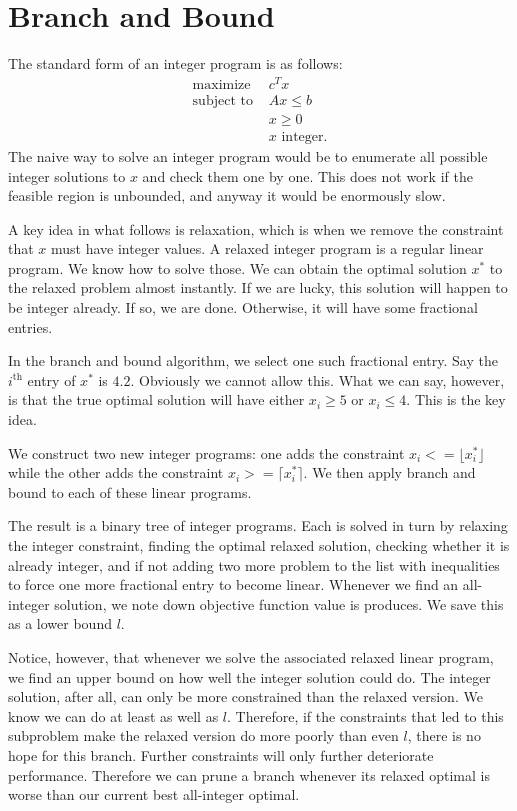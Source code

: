 \documentclass{article}
\begin{document}
\section*{Branch and Bound}

The standard form of an integer program is as follows: \begin{align*}
    \text{maximize } & c^T x \\ 
    \text{subject to } & Ax \leq b \\
    & x \geq 0 \\
    & x \text{ integer}.
\end{align*} The naive way to solve an integer program would be to enumerate all possible integer solutions to $x$ and check them one by one. This does not work if the feasible region is unbounded, and anyway it would be enormously slow.

A key idea in what follows is relaxation, which is when we remove the constraint that $x$ must have integer values. A relaxed integer program is a regular linear program. We know how to solve those. We can obtain the optimal solution $x^\ast$ to the relaxed problem almost instantly. If we are lucky, this solution will happen to be integer already. If so, we are done. Otherwise, it will have some fractional entries.

In the branch and bound algorithm, we select one such fractional entry. Say the $i^\text{th}$ entry of $x^\ast$ is $4.2$. Obviously we cannot allow this. What we can say, however, is that the true optimal solution will have either $x_i \geq 5$ or $x_i \leq 4$. This is the key idea.

We construct two new integer programs: one adds the constraint $x_i <= \lfloor x_i^\ast \rfloor$ while the other adds the constraint $x_i >= \lceil x_i^\ast \rceil$. We then apply branch and bound to each of these linear programs.

The result is a binary tree of integer programs. Each is solved in turn by relaxing the integer constraint, finding the optimal relaxed solution, checking whether it is already integer, and if not adding two more problem to the list with inequalities to force one more fractional entry to become linear. Whenever we find an all-integer solution, we note down objective function value is produces. We save this as a lower bound $l$.

Notice, however, that whenever we solve the associated relaxed linear program, we find an upper bound on how well the integer solution could do. The integer solution, after all, can only be more constrained than the relaxed version. We know we can do at least as well as $l$. Therefore, if the constraints that led to this subproblem make the relaxed version do more poorly than even $l$, there is no hope for this branch. Further constraints will only further deteriorate performance. Therefore we can prune a branch whenever its relaxed optimal is worse than our current best all-integer optimal.
\end{document}

